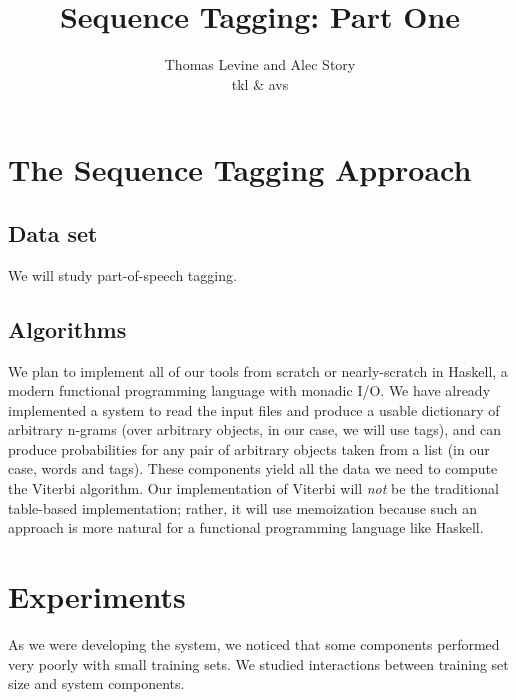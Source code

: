 \documentclass{article}
\title{Sequence Tagging: Part One}
\author{Thomas Levine and Alec Story\\\small{tkl\osn{22} \& avs\osn{38}}}
\begin{document}
\maketitle

\section{The Sequence Tagging Approach}


\subsection{Data set}
We will study part-of-speech tagging.
\subsection{Algorithms}
We plan to implement all of our tools from scratch or nearly-scratch in Haskell,
a modern functional programming language with monadic I/O.  We have already
implemented a system to read the input files and produce a usable dictionary of
arbitrary n-grams (over arbitrary objects, in our case, we will use tags), and
can produce probabilities for any pair of arbitrary objects taken from a list
(in our case, words and tags).  These components yield all the data we need to
compute the Viterbi algorithm.  Our implementation of Viterbi will \emph{not} be
the traditional table-based implementation; rather, it will use memoization
because such an approach is more natural for a functional programming language
like Haskell.



\section{Experiments}


As we were developing the system, we noticed that some components performed
very poorly with small training sets. 
We studied interactions between training set size and system components.
\end{document}
